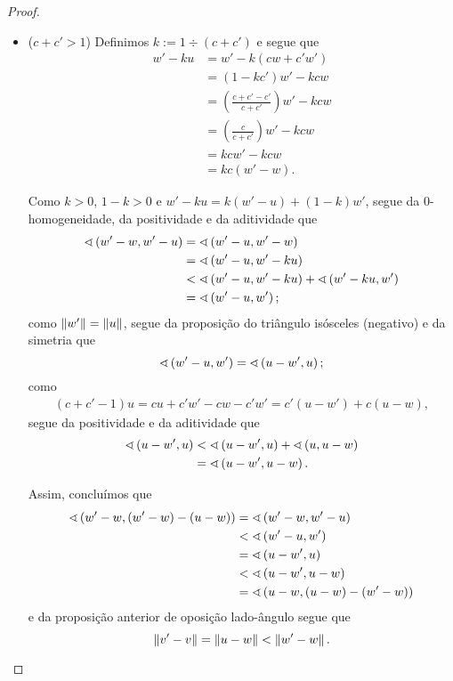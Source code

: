 \begin{proof}
\begin{enumerate}
\begin{itemize}
		\item ($c+c' > 1$) Definimos $k := 1 \div (c+c')$ e segue que
			\begin{align*}
			w'-ku &= w'-k(cw+c'w') \\
				&= (1-kc')w'-kcw \\
				&= \left( \frac{c+c'-c'}{c+c'} \right)w'-kcw \\
				&= \left( \frac{c}{c+c'} \right)w'-kcw \\
				&= kcw'-kcw \\
				&= kc(w'-w).
			\end{align*}

		Como $k>0$, $1-k>0$ e $w'-ku = k(w'-u) + (1-k)w'$, segue da $0$-homogeneidade, da positividade e da aditividade que
			\begin{align*}
			\sphericalangle\left({w'-w},{w'-u}\right) &= \sphericalangle\left({w'-u},{w'-w}\right) \\
				&= \sphericalangle\left({w'-u},{w'-ku}\right) \\
				&< \sphericalangle\left({w'-u},{w'-ku}\right) + \sphericalangle\left({w'-ku},{w'}\right) \\
				&= \sphericalangle\left({w'-u},{w'}\right);
			\end{align*}
		como $\left\Vert{w'}\right\Vert=\left\Vert{u}\right\Vert$, segue da proposição do triângulo isósceles (negativo) e da simetria que
			\begin{equation*}
			\sphericalangle\left({w'-u},{w'}\right) = \sphericalangle\left({u-w'},{u}\right);
			\end{equation*}
		como
			\begin{align*}
			(c+c'-1)u = cu+c'w'-cw-c'w' = c'(u-w')+c(u-w),
			\end{align*}
		segue da positividade e da aditividade que
			\begin{align*}
			\sphericalangle\left({u-w'},{u}\right) &< \sphericalangle\left({u-w'},{u}\right) + \sphericalangle\left({u},{u-w}\right) \\
				&= \sphericalangle\left({u-w'},{u-w}\right).
			\end{align*}

		Assim, concluímos que
			\begin{align*}
			\sphericalangle\left({w'-w},{(w'-w)-(u-w)}\right) &= \sphericalangle\left({w'-w},{w'-u}\right) \\
				&< \sphericalangle\left({w'-u},{w'}\right) \\
				&= \sphericalangle\left({u-w'},{u}\right) \\
				&< \sphericalangle\left({u-w'},{u-w}\right) \\
				&= \sphericalangle\left({u-w},{(u-w)-(w'-w)}\right)
			\end{align*}
		e da proposição anterior de oposição lado-ângulo segue que
			\begin{equation*}
			\left\Vert{v'-v}\right\Vert = \left\Vert{u-w}\right\Vert < \left\Vert{w'-w}\right\Vert.
			\end{equation*}
		\end{itemize}

	\end{enumerate}
\end{proof}

